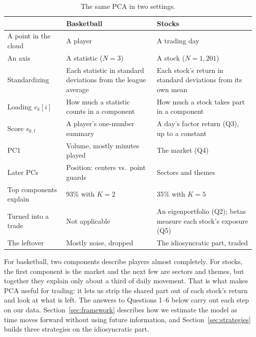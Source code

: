 \documentclass[11pt,letterpaper]{article}
\begin{document}
\begin{table}[!htbp]
    \centering
    \caption{The same PCA in two settings.}
    \label{tab:primer-map}
    \begin{tabular}{L{0.23}L{0.36}L{0.41}}
        \toprule
        & Basketball & Stocks \\
        \midrule
        A point in the cloud & A player & A trading day \\
        An axis & A statistic ($N=3$) & A stock ($N=1{,}201$) \\
        Standardizing & Each statistic in standard deviations from the league average & Each stock's return in standard deviations from its own mean \\
        Loading $v_k[i]$ & How much a statistic counts in a component & How much a stock takes part in a component \\
        Score $s_{k,t}$ & A player's one-number summary & A day's factor return (Q3), up to a constant \\
        PC1 & Volume, mostly minutes played & The market (Q4) \\
        Later PCs & Position: centers vs.\ point guards & Sectors and themes \\
        Top components explain & 93\% with $K=2$ & 35\% with $K=5$ \\
        Turned into a trade & Not applicable & An eigenportfolio (Q2); betas measure each stock's exposure (Q5) \\
        The leftover & Mostly noise, dropped & The idiosyncratic part, traded \\
        \bottomrule
    \end{tabular}
\end{table}

For basketball, two components describe players almost completely. For
stocks, the first component is the market and the next few are sectors
and themes, but together they explain only about a third of daily
movement. That is what makes PCA useful for trading: it lets us strip the
shared part out of each stock's return and look at what is left. The
answers to Questions 1--6 below carry out each step on our data.
Section~\ref{sec:framework} describes how we estimate the model as time moves forward
without using future information, and Section~\ref{sec:strategies} builds three strategies
on the idiosyncratic part.

\end{document}
